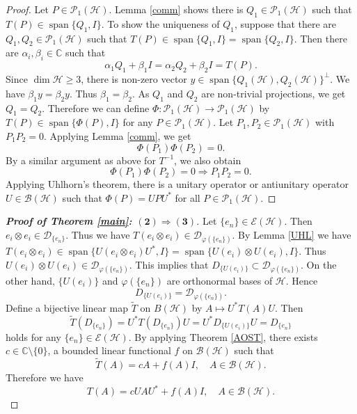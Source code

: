 \documentclass[11pt]{amsart}
\theoremstyle{remark}
\newcommand{\BH}{\mathcal{B(H)}}
\newcommand{\cH}{{\mathcal{H}}}
\newcommand{\PH}{\mathcal{P}_1(\cH)}
\newcommand{\Span}{\operatorname{span}}
\begin{document}
\begin{proof}
Let $P \in \PH$.  Lemma \ref{comm} shows there is $Q_1 \in \PH$ such that $T(P) \in \operatorname{span}\{Q_1, I\}$. To show  the uniqueness of  $Q_1$,  suppose that there are $Q_1, Q_2 \in \PH$ such that 
$T(P)\in \operatorname{span}\{Q_1, I\}=\operatorname{span}\{Q_2, I\}$. Then there are $\alpha_i, \beta_i \in \mathbb{C}$ such that
\[
\alpha_1 Q_1+\beta_1I=\alpha_2 Q_2+\beta_2I=T(P).
\]
Since $\dim \cH \ge 3$, there is non-zero vector $y \in \operatorname{span}\{ Q_1(\cH), Q_2(\cH)\}^{\perp}$. We have $\beta_1y=\beta_2y$. Thus $\beta_1=\beta_2$. As $Q_1$ and $Q_2$ are non-trivial projections, we get $Q_1=Q_2$. Therefore we can define  $\Phi: \PH \to \PH$ by $T(P) \in \operatorname{span}\{\Phi(P) ,I \} $ for any $P \in \PH$. Let $P_1,P_2 \in \PH $ with $P_1P_2=0$. Applying Lemma \ref{comm},  we get
\[
\Phi(P_1)\Phi(P_2)=0.
\] 
By a similar argument as above for $T^{-1}$,  we also obtain 
\[
\Phi(P_1) \Phi(P_2)=0  \Longrightarrow P_1P_2=0.
\]
Applying Uhlhorn's theorem, there is a unitary operator or antiunitary operator $U \in \BH$ such that $\Phi(P)=UPU^{*}$ for all $P \in \PH$. 
\end{proof}

\begin{proof}[{\textbf {Proof of Theorem \ref{main}: $\bm{(2) \Rightarrow (3)}$}}] 
Let $\{e_n\} \in \mathcal{E}(\cH)$. Then  $e_i \otimes e_i \in \mathcal{D}_{\{e_n\}}$. Thus we have $T(e_i \otimes e_i) \in \mathcal{D}_{\varphi(\{e_n\})}$. By Lemma \ref{UHL} we have $T(e_i \otimes e_i) \in \Span \{U(e_i \otimes e_i)U^{*}, I\} =\Span \{U(e_i) \otimes U(e_i), I\} $. Thus $U(e_i) \otimes U(e_i) \in \mathcal{D}_{\varphi(\{e_n\})}$. This implies that 
$D_{\{U(e_i)\}} \subset \mathcal{D}_{\varphi(\{e_n\})}$.
On the other hand,  $\{U(e_i)\}$ and $\varphi(\{e_n\})$ are orthonormal bases of $\cH$. Hence
\[
D_{\{U(e_i)\}} = \mathcal{D}_{\varphi(\{e_n\})}.
\]
Define a bijective linear map $\widetilde{T}$ on $B(\cH)$ by $A \mapsto U^{*}T(A)U$. Then 
\[
\widetilde{T}(D_{\{e_n\}})=U^{*}T(D_{\{e_n\}})U=U^{*}D_{\{U(e_i)\}}U=D_{\{e_n\}}
\]
holds for any $\{e_n\} \in \mathcal{E}(\cH)$. By applying Theorem \ref{AOST}, there exists $c \in \mathbb{C} \setminus \{0\}$, a bounded linear functional $f$ on $\BH$ such that 
\[
\widetilde{T}(A)=cA+f(A)I, \quad A \in \BH.
\]   
Therefore we have
\[
T(A)=cUAU^{*}+f(A)I, \quad A \in \BH.
\]
\end{proof}
\end{document}
